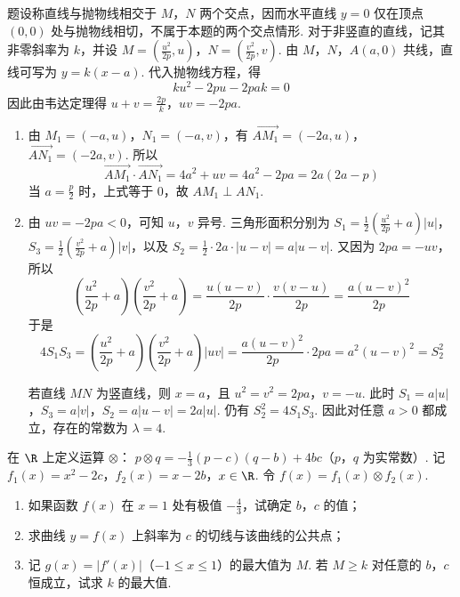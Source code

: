 \begin{solution}
题设称直线与抛物线相交于 \(M\)，\(N\) 两个交点，因而水平直线 \(y=0\) 仅在顶点
\((0,0)\) 处与抛物线相切，不属于本题的两个交点情形. 对于非竖直的直线，记其非零斜率为 \(k\)，并设 \(M=\left(\frac{u^{2}}{2p},u\right)\)，\(N=\left(\frac{v^{2}}{2p},v\right)\).
由 \(M\)，\(N\)，\(A(a,0)\) 共线，直线可写为 \(y=k(x-a)\). 代入抛物线方程，得
\[
ku^{2}-2pu-2pak=0
\]
因此由韦达定理得 \(u+v=\frac{2p}{k}\)，\(uv=-2pa\).

\begin{enumerate}
\item 由 \(M_{1}=(-a,u)\)，\(N_{1}=(-a,v)\)，有 \(\overrightarrow{AM_{1}}=(-2a,u)\)，\(\overrightarrow{AN_{1}}=(-2a,v)\).
所以
\[
\overrightarrow{AM_{1}}\cdot\overrightarrow{AN_{1}}=4a^{2}+uv
=4a^{2}-2pa=2a(2a-p)
\]
当 \(a=\frac{p}{2}\) 时，上式等于 \(0\)，故 \(AM_{1}\perp AN_{1}\).

\item 由 \(uv=-2pa<0\)，可知 \(u\)，\(v\) 异号. 三角形面积分别为 \(S_{1}=\frac12\left(\frac{u^{2}}{2p}+a\right)|u|\)，\(S_{3}=\frac12\left(\frac{v^{2}}{2p}+a\right)|v|\)，以及 \(S_{2}=\frac12\cdot2a\cdot|u-v|=a|u-v|\).
又因为 \(2pa=-uv\)，所以
\[
\left(\frac{u^{2}}{2p}+a\right)\left(\frac{v^{2}}{2p}+a\right)
=\frac{u(u-v)}{2p}\cdot\frac{v(v-u)}{2p}
=\frac{a(u-v)^{2}}{2p}
\]
于是
\[
4S_{1}S_{3}
=\left(\frac{u^{2}}{2p}+a\right)\left(\frac{v^{2}}{2p}+a\right)|uv|
=\frac{a(u-v)^{2}}{2p}\cdot2pa
=a^{2}(u-v)^{2}=S_{2}^{2}
\]

若直线 \(MN\) 为竖直线，则 \(x=a\)，且 \(u^{2}=v^{2}=2pa\)，\(v=-u\). 此时 \(S_{1}=a|u|\)，\(S_{3}=a|v|\)，\(S_{2}=a|u-v|=2a|u|\).
仍有 \(S_{2}^{2}=4S_{1}S_{3}\). 因此对任意 \(a>0\) 都成立，存在的常数为 \(\lambda=4\).
\end{enumerate}
\end{solution}

\begin{problem}
在 \(\R\) 上定义运算 \(\otimes\)： \(p \otimes q = -\frac{1}{3}(p - c)(q - b) + 4bc\)（\(p\)，\(q\) 为实常数）. 记 \(f_1(x) = x^{2} - 2c\)，\(f_2(x) = x - 2b\)，\(x \in \R\). 令 \(f(x) = f_1(x) \otimes f_2(x)\).

\begin{enumerate}
\item 如果函数 \(f(x)\) 在 \(x = 1\) 处有极值 \(-\frac{4}{3}\)，试确定 \(b\)，\(c\) 的值；
\item 求曲线 \(y = f(x)\) 上斜率为 \(c\) 的切线与该曲线的公共点；
\item 记 \(g(x) = |f'(x)|\)（\(-1 \leqslant x \leqslant 1\)）的最大值为 \(M\). 若 \(M \geqslant k\) 对任意的 \(b\)，\(c\) 恒成立，试求 \(k\) 的最大值.
\end{enumerate}
\end{problem}


